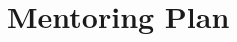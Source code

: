 \documentclass[11pt,oneside,final]{article}
\begin{document}
    \section*{Mentoring Plan}
\end{document}
